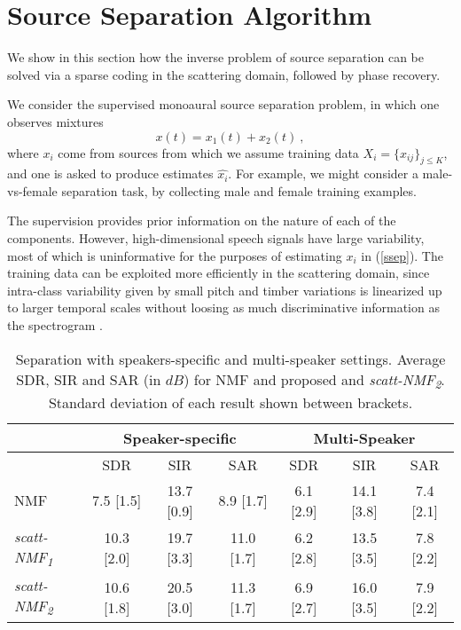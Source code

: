 \section{Source Separation Algorithm}
\label{algosec}
We show in this section how the inverse problem of source separation 
can be solved via a sparse coding in the scattering domain, followed by phase recovery.

We consider the supervised 
monoaural source separation problem, in which one observes mixtures 
\begin{equation}
\label{ssep}
x(t) = x_1(t) + x_2(t)~,
\end{equation}
where $x_i$ come from sources from which we assume training data $X_i=\{x_{ij}\}_{j \leq K}$, 
and one is asked to produce estimates $\widehat{x_i}$. 
For example, we might consider a male-vs-female separation task, by 
collecting male and female training examples. 

The supervision provides  prior information on the nature of each of the 
components. However, high-dimensional speech signals have large variability, 
most of which is uninformative for the purposes of estimating $x_i$ in (\ref{ssep}).
The training data can be exploited more efficiently in the scattering domain, since 
intra-class variability given by small pitch and timber variations is linearized up to 
larger temporal scales without loosing as much discriminative information as 
the spectrogram \cite{deepscatt,pami}.

\begin{table*}[t]
\centering
\begin{tabular}{l|c|c|c || c |c |c }
  \hline\hline
  & \multicolumn{3}{c||}{Speaker-specific} & \multicolumn{3}{c}{Multi-Speaker} \\
  \hline
 & SDR & SIR & SAR & SDR & SIR & SAR\\
\hline
NMF  &7.5 [1.5] & 13.7 [0.9] &   8.9 [1.7] & 6.1 [2.9] &   14.1 [3.8] & 7.4 [2.1] \\
\hline
\emph{scatt-NMF\textsubscript{1}} & 10.3 [2.0]  & 19.7 [3.3]  & 11.0 [1.7] &  6.2 [2.8] &   13.5 [3.5] & 7.8 [2.2] \\
\emph{scatt-NMF\textsubscript{2}} &  10.6 [1.8] & 20.5 [3.0]  & 11.3 [1.7]  &  6.9 [2.7] & 16.0 [3.5]  & 7.9 [2.2] \\
  \hline
\end{tabular}

\caption{Separation with speakers-specific and multi-speaker settings. Average SDR, SIR and SAR (in $dB$) for NMF and proposed  and \emph{scatt-NMF\textsubscript{2}}. Standard deviation of each result shown between brackets. \label{ta:eval}}
\vspace{-2ex}
\end{table*}


